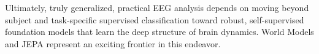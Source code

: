 \documentclass[11pt]{article}
\begin{document}
Ultimately, truly generalized, practical EEG analysis depends on moving beyond subject and task-specific supervised classification toward robust, self-supervised foundation models that learn the deep structure of brain dynamics. World Models and JEPA represent an exciting frontier in this endeavor.




\end{document}
